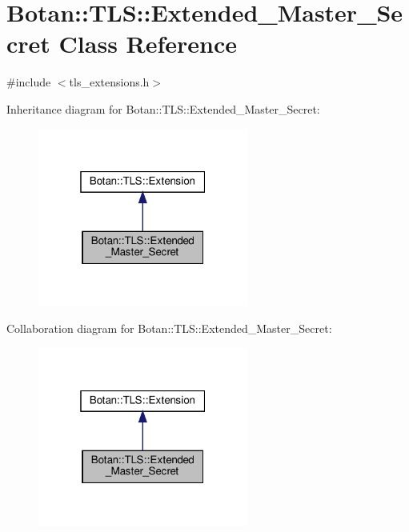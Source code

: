 \hypertarget{class_botan_1_1_t_l_s_1_1_extended___master___secret}{}\section{Botan\+:\+:T\+LS\+:\+:Extended\+\_\+\+Master\+\_\+\+Secret Class Reference}
\label{class_botan_1_1_t_l_s_1_1_extended___master___secret}


{\ttfamily \#include $<$tls\+\_\+extensions.\+h$>$}



Inheritance diagram for Botan\+:\+:T\+LS\+:\+:Extended\+\_\+\+Master\+\_\+\+Secret\+:
\nopagebreak
\begin{figure}[H]
\begin{center}
\leavevmode
\includegraphics[width=196pt]{class_botan_1_1_t_l_s_1_1_extended___master___secret__inherit__graph}
\end{center}
\end{figure}


Collaboration diagram for Botan\+:\+:T\+LS\+:\+:Extended\+\_\+\+Master\+\_\+\+Secret\+:
\nopagebreak
\begin{figure}[H]
\begin{center}
\leavevmode
\includegraphics[width=196pt]{class_botan_1_1_t_l_s_1_1_extended___master___secret__coll__graph}
\end{center}
\end{figure}
